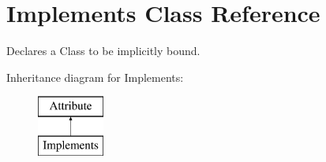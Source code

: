 \hypertarget{class_implements}{\section{Implements Class Reference}
\label{class_implements}
}


Declares a Class to be implicitly bound.  


Inheritance diagram for Implements\-:\begin{figure}[H]
\begin{center}
\leavevmode
\includegraphics[height=2.000000cm]{class_implements}
\end{center}
\end{figure}

